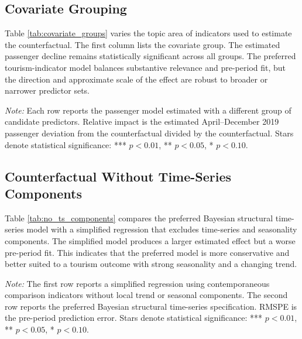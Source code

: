 \documentclass[12pt]{article}
\begin{document}
\subsection{Covariate Grouping}

Table \ref{tab:covariate_groups} varies the topic area of indicators used to estimate the counterfactual. The first column lists the covariate group. The estimated passenger decline remains statistically significant across all groups. The preferred tourism-indicator model balances substantive relevance and pre-period fit, but the direction and approximate scale of the effect are robust to broader or narrower predictor sets.

\begin{table}[htbp]\centering\caption{Passenger Effects Under Alternative Covariate Groups}\label{tab:covariate_groups}\resizebox{\textwidth}{!}{}\par\vspace{0.35em}\noindent\begin{minipage}{0.95\linewidth}\raggedright\scriptsize \textit{Note:} Each row reports the passenger model estimated with a different group of candidate predictors. Relative impact is the estimated April--December 2019 passenger deviation from the counterfactual divided by the counterfactual. Stars denote statistical significance: *** $p<0.01$, ** $p<0.05$, * $p<0.10$.\end{minipage}\end{table}

\subsection{Counterfactual Without Time-Series Components}

Table \ref{tab:no_ts_components} compares the preferred Bayesian structural time-series model with a simplified regression that excludes time-series and seasonality components. The simplified model produces a larger estimated effect but a worse pre-period fit. This indicates that the preferred model is more conservative and better suited to a tourism outcome with strong seasonality and a changing trend.

\begin{table}[htbp]\centering\caption{Passenger Effects With and Without Time-Series Components}\label{tab:no_ts_components}\resizebox{\textwidth}{!}{}\par\vspace{0.35em}\noindent\begin{minipage}{0.95\linewidth}\raggedright\scriptsize \textit{Note:} The first row reports a simplified regression using contemporaneous comparison indicators without local trend or seasonal components. The second row reports the preferred Bayesian structural time-series specification. RMSPE is the pre-period prediction error. Stars denote statistical significance: *** $p<0.01$, ** $p<0.05$, * $p<0.10$.\end{minipage}\end{table}
\end{document}
